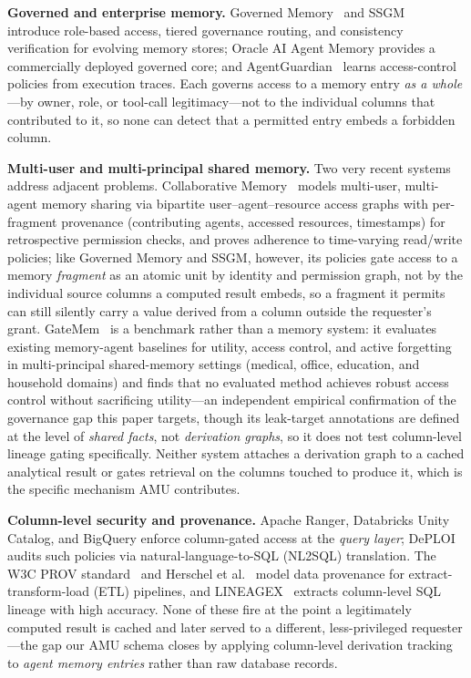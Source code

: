 \documentclass[nolineno]{ieeeaccess}
\begin{document}
\textbf{Governed and enterprise memory.}
Governed Memory~\cite{taheri2026governed} and SSGM~\cite{lam2026ssgm}
introduce role-based access, tiered governance routing, and consistency
verification for evolving memory stores; Oracle AI Agent Memory
\cite{oracle2026memory} provides a commercially deployed governed core; and
AgentGuardian~\cite{abaev2026agentguardian} learns access-control policies
from execution traces.
Each governs access to a memory entry \emph{as a whole}---by owner, role, or
tool-call legitimacy---not to the individual columns that contributed to it,
so none can detect that a permitted entry embeds a forbidden column.

\textbf{Multi-user and multi-principal shared memory.}
Two very recent systems address adjacent problems. Collaborative
Memory~\cite{rezazadeh2025collabmem} models multi-user, multi-agent memory
sharing via bipartite user--agent--resource access graphs with per-fragment
provenance (contributing agents, accessed resources, timestamps) for
retrospective permission checks, and proves adherence to time-varying
read/write policies; like Governed Memory and SSGM, however, its policies
gate access to a memory \emph{fragment} as an atomic unit by identity and
permission graph, not by the individual source columns a computed result
embeds, so a fragment it permits can still silently carry a value derived
from a column outside the requester's grant. GateMem~\cite{ren2026gatemem}
is a benchmark rather than a memory system: it evaluates existing
memory-agent baselines for utility, access control, and active forgetting in
multi-principal shared-memory settings (medical, office, education, and
household domains) and finds that no evaluated method achieves robust
access control without sacrificing utility---an independent empirical
confirmation of the governance gap this paper targets, though its
leak-target annotations are defined at the level of \emph{shared facts},
not \emph{derivation graphs}, so it does not test column-level lineage
gating specifically. Neither system attaches a derivation graph to a cached
analytical result or gates retrieval on the columns touched to produce it,
which is the specific mechanism AMU contributes.

\textbf{Column-level security and provenance.}
Apache Ranger, Databricks Unity Catalog, and BigQuery enforce column-gated
access at the \emph{query layer}; DePLOI~\cite{subramaniam2024deploi} audits
such policies via natural-language-to-SQL (NL2SQL) translation.
The W3C PROV standard~\cite{moreau2011prov} and Herschel et
al.~\cite{herschel2017survey} model data provenance for extract-transform-load
(ETL) pipelines, and
LINEAGEX~\cite{zhang2025lineagex} extracts column-level SQL lineage with
high accuracy.
None of these fire at the point a legitimately computed result is cached and
later served to a different, less-privileged requester---the gap our AMU
schema closes by applying column-level derivation tracking to \emph{agent
memory entries} rather than raw database records.
\end{document}
